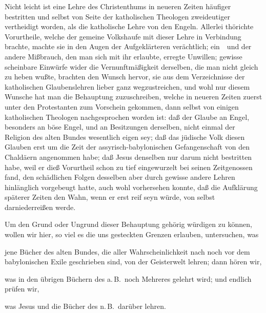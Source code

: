 Nicht leicht ist eine Lehre des Christenthums in neueren Zeiten häufiger bestritten und selbst von Seite der katholischen Theologen zweideutiger vertheidigt worden, als die katholische Lehre von den Engeln. Allerlei thörichte Vorurtheile, welche der gemeine Volkshaufe mit dieser Lehre in Verbindung brachte, machte sie in den Augen der Aufgeklärteren verächtlich; ein~\ und der andere Mißbrauch, den man sich mit ihr erlaubte, erregte Unwillen; gewisse scheinbare Einwürfe wider die Vernunftmäßigkeit derselben, die man nicht gleich zu heben wußte, brachten den Wunsch hervor, sie aus dem Verzeichnisse der katholischen Glaubenslehren lieber ganz wegzustreichen, und wohl nur diesem Wunsche hat man die Behauptung zuzuschreiben, welche in neueren Zeiten zuerst unter den Protestanten zum Vorschein gekommen, dann selbst von einigen katholischen Theologen nachgesprochen worden ist: daß der Glaube an Engel, besonders an böse Engel, und an Besitzungen derselben, nicht einmal der Religion des alten Bundes wesentlich eigen sey; daß das jüdische Volk diesen Glauben erst um die Zeit der assyrisch-babylonischen Gefangenschaft von den Chaldäern angenommen habe; daß Jesus denselben nur darum nicht bestritten habe, weil er dieß Vorurtheil schon zu tief eingewurzelt bei seinen Zeitgenossen fand, den schädlichen Folgen desselben aber durch gewisse andere Lehren hinlänglich vorgebeugt hatte, auch wohl vorhersehen konnte, daß die Aufklärung späterer Zeiten den Wahn, wenn er erst reif seyn würde, von selbst darniederreißen werde.\par
Um den Grund oder Ungrund dieser Behauptung gehörig würdigen zu können, wollen wir hier, so viel es die uns gesteckten Grenzen erlauben, untersuchen, was
\begin{aufzb}
\item jene Bücher des alten Bundes, die aller Wahrscheinlichkeit nach noch vor dem babylonischen Exile geschrieben sind, von der Geisterwelt lehren; dann hören wir,
\item was in den übrigen Büchern des a.\,B.\ noch Mehreres gelehrt wird; und endlich prüfen wir,
\item was Jesus und die Bücher des n.\,B.\ darüber lehren.
\end{aufzb}

